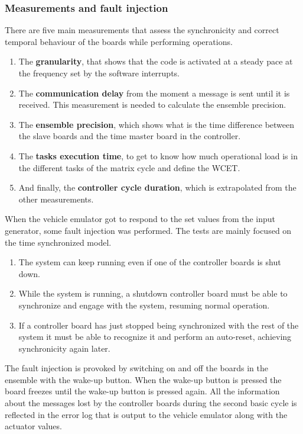 \documentclass[table,xcdraw]{article}
\begin{document}
\subsubsection{Measurements and fault injection}
There are five main measurements that assess the synchronicity and correct temporal behaviour of the boards while performing operations.
\begin{enumerate}
    \item The \textbf{granularity}, that shows that the code is activated at a steady pace at the frequency set by the software interrupts.
    \item The \textbf{communication delay} from the moment a message is sent until it is received. This measurement is needed to calculate the ensemble precision.
    \item The \textbf{ensemble precision}, which shows what is the time difference between the slave boards and the time master board in the controller.
    \item The \textbf{tasks execution time}, to get to know how much operational load is in the different tasks of the matrix cycle and define the WCET.
    \item And finally, the \textbf{controller cycle duration}, which is extrapolated from the other measurements.\\
\end{enumerate}
When the vehicle emulator got to respond to the set values from the input generator, some fault injection was performed. The tests are mainly focused on the time synchronized model.
\begin{enumerate}
\item The system can keep running even if one of the controller boards is shut down. 
\item While the system is running, a shutdown controller board must be able to synchronize and engage with the system, resuming normal operation.
\item If a controller board has just stopped being synchronized with the rest of the system it must be able to recognize it and perform an auto-reset, achieving synchronicity again later.
\end{enumerate}
The fault injection is provoked by switching on and off the boards in the ensemble with the wake-up button. When the wake-up button is pressed the board freezes until the wake-up button is pressed again. All the information about the messages lost by the controller boards during the second basic cycle is reflected in the error log that is output to the vehicle emulator along with the actuator values.
\end{document}
